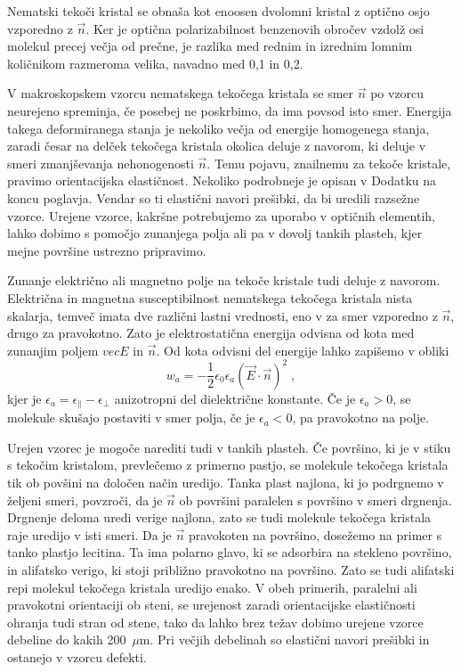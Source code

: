 Nematski tekoči kristal se obnaša kot enoosen dvolomni kristal z optično
osjo vzporedno z $\vec{n}$. Ker je optična polarizabilnost benzenovih
obročev vzdolž osi molekul precej večja od prečne, je razlika med
rednim in izrednim lomnim količnikom razmeroma velika, navadno med
0,1 in 0,2.

V makroskopskem vzorcu nematskega tekočega kristala se smer $\vec{n}$
po vzorcu neurejeno spreminja, če posebej ne poskrbimo, da ima povsod
isto smer. Energija takega deformiranega stanja je nekoliko večja
od energije homogenega stanja, zaradi česar na delček tekočega kristala
okolica deluje z navorom, ki deluje v smeri zmanjševanja nehonogenosti
$\vec{n}$. Temu pojavu, zna\textquotedbl{}ilnemu za tekoče kristale,
pravimo orientacijska elastičnost. Nekoliko podrobneje je opisan v
Dodatku na koncu poglavja. Vendar so ti elastični navori prešibki,
da bi uredili razsežne vzorce. Urejene vzorce, kakršne potrebujemo
za uporabo v optičnih elementih, lahko dobimo s pomočjo zunanjega
polja ali pa v dovolj tankih plasteh, kjer mejne površine ustrezno
pripravimo.

Zunanje električno ali magnetno polje na tekoče kristale tudi deluje
z navorom. Električna in magnetna susceptibilnost nematskega tekočega
kristala nista skalarja, temveč imata dve različni lastni vrednosti,
eno v za smer vzporedno z $\vec{n}$, drugo za pravokotno. Zato je
elektrostatična energija odvisna od kota med zunanjim poljem $vec{E}$
in $\vec{n}$. Od kota odvisni del energije lahko zapišemo v obliki
\begin{equation}
w_{a}=-\frac{1}{2}\epsilon_{0}\epsilon_{a}(\vec{E}\cdot\vec{n})^{2}\;,\label{7.56}
\end{equation}
 kjer je $\epsilon_{a}=\epsilon_{\parallel}-\epsilon_{\perp}$ anizotropni
del dielektrične konstante. Če je $\epsilon_{a}>0$, se molekule skušajo
postaviti v smer polja, če je $\epsilon_{a}<0$, pa pravokotno na
polje.

Urejen vzorec je mogoče narediti tudi v tankih plasteh. Če površino,
ki je v stiku s tekočim kristalom, prevlečemo z primerno pastjo, se
molekule tekočega kristala tik ob povšini na določen način uredijo.
Tanka plast najlona, ki jo podrgnemo v željeni smeri, povzroči, da
je $\vec{n}$ ob površini paralelen s površino v smeri drgnenja. Drgnenje
deloma uredi verige najlona, zato se tudi molekule tekočega kristala
raje uredijo v isti smeri. Da je $\vec{n}$ pravokoten na površino,
dosežemo na primer s tanko plastjo lecitina. Ta ima polarno glavo,
ki se adsorbira na stekleno površino, in alifatsko verigo, ki stoji
približno pravokotno na površino. Zato se tudi alifatski repi molekul
tekočega kristala uredijo enako. V obeh primerih, paralelni ali pravokotni
orientaciji ob steni, se urejenost zaradi orientacijske elastičnosti
ohranja tudi stran od stene, tako da lahko brez težav dobimo urejene
vzorce debeline do kakih 200~$\mu$m. Pri večjih debelinah so elastični
navori prešibki in ostanejo v vzorcu defekti.

